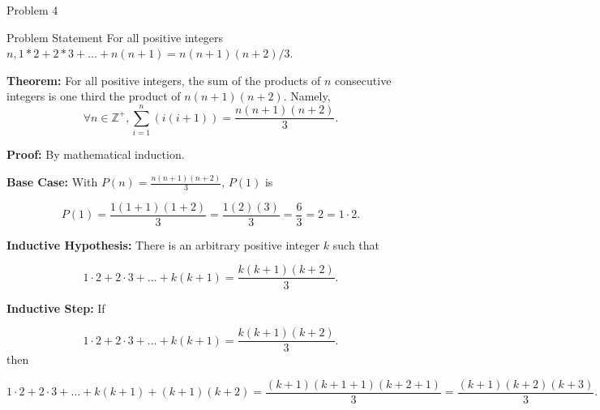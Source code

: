 \begin{problem}{Problem 4}
    \begin{statement}{Problem Statement}
        For all positive integers $n, 1*2 + 2*3 + \dots + n(n + 1) = n(n + 1)(n + 2)/3$.
    \end{statement}

    \begin{Highlight}[Solution]
        \noindent \textbf{Theorem:} For all positive integers, the sum of the products of $n$ consecutive integers is one third the product of $n(n + 1)(n + 2)$. Namely,
        \begin{equation*}
            \forall n \in \mathbb{Z}^{+}, \sum_{i = 1}^{n}(i(i + 1)) = \frac{n(n + 1)(n + 2)}{3}.
        \end{equation*}

        \noindent \textbf{Proof:} By mathematical induction. \vspace*{1em}

        \noindent \textbf{Base Case:} With $P(n) = \frac{n(n + 1)(n + 2)}{3}$, $P(1)$ is 

        \begin{equation*}
            P(1) = \frac{1(1 + 1)(1 + 2)}{3} = \frac{1(2)(3)}{3} = \frac{6}{3} = 2 = 1 \cdot 2.
        \end{equation*}

        \noindent \textbf{Inductive Hypothesis:} There is an arbitrary positive integer $k$ such that 

        \begin{equation*}
            1 \cdot 2 + 2 \cdot 3 + \dots + k(k + 1) = \frac{k(k + 1)(k + 2)}{3}.
        \end{equation*}

        \noindent \textbf{Inductive Step:} If 

        \begin{equation*}
            1 \cdot 2 + 2 \cdot 3 + \dots + k(k + 1) = \frac{k(k + 1)(k + 2)}{3}.
        \end{equation*}
        then 

        \begin{equation*}
            1 \cdot 2 + 2 \cdot 3 + \dots + k(k + 1) + (k + 1)(k + 2) = \frac{(k + 1)(k + 1 + 1)(k + 2 + 1)}{3} = \frac{(k + 1)(k + 2)(k + 3)}{3}.
        \end{equation*}


\end{Highlight}
\end{problem}
